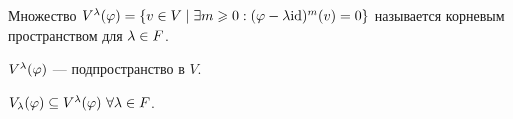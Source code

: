 \begin{Def}
Множество $V^\lambda(\varphi) = \{ v \in V \mid \exists m \geqslant 0  : (\varphi - \lambda\mathrm{id})^m(v) = 0 \}$ называется корневым пространством для $\lambda \in F$.
\end{Def}

\begin{Task}
$V^\lambda(\varphi)$ --- подпространство в $V$.
\end{Task}

\begin{Comment}
$V_\lambda(\varphi) \subseteq V^\lambda(\varphi) \ \forall \lambda \in F$.
\end{Comment}

